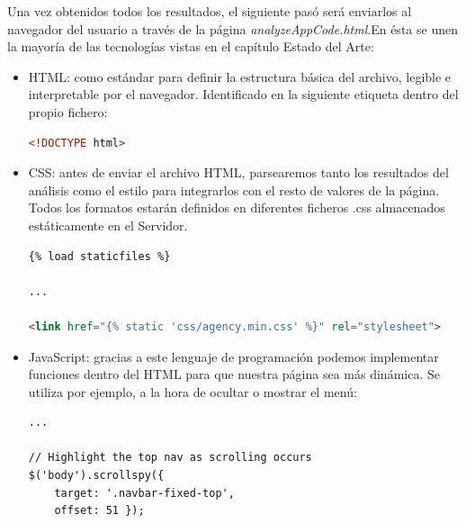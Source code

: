 \documentclass[a4paper, 12pt]{book}
\begin{document}
Una vez obtenidos todos los resultados, el siguiente pasó será enviarlos al navegador del usuario a través de la página \textit{analyzeAppCode.html}.En ésta se unen la mayoría de las tecnologías vistas en el capítulo Estado del Arte:
\begin{itemize}
	\item HTML: como estándar para definir la estructura básica del archivo, legible e interpretable por el navegador. Identificado en la siguiente etiqueta dentro del propio fichero:	
		\begin{lstlisting}[language=HTML]
<!DOCTYPE html>
		\end{lstlisting}
	\item CSS: antes de enviar el archivo HTML, parsearemos tanto los resultados del análisis como el estilo para integrarlos con el resto de valores de la página. Todos los formatos estarán definidos en diferentes ficheros .css almacenados estáticamente en el Servidor.  
		\begin{lstlisting}[language=HTML]
{% load staticfiles %}

...

<link href="{% static 'css/agency.min.css' %}" rel="stylesheet">
		\end{lstlisting}
	\item JavaScript: gracias a este lenguaje de programación podemos implementar funciones dentro del HTML para que nuestra página sea más dinámica. Se utiliza por ejemplo, a la hora de ocultar o mostrar el menú:
	\begin{lstlisting}[language=HTML]
... 

// Highlight the top nav as scrolling occurs
$('body').scrollspy({
	target: '.navbar-fixed-top',
	offset: 51 });


\end{lstlisting}
\end{itemize}
\end{document}

